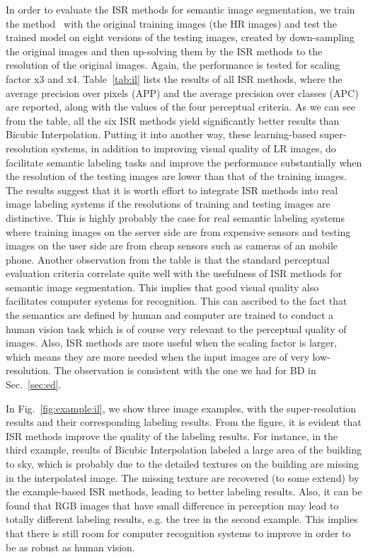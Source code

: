 \documentclass[10pt,twocolumn,letterpaper]{article}
\begin{document}
In order to evaluate the ISR methods for semantic image segmentation, we train the
method~\cite{superpixel:eccv14} with the original training images (\eg the HR images) and
test the trained model on eight versions of the testing images,
created by down-sampling the original images and then up-solving them
by the ISR methods to the resolution of the original images. Again,
the performance is tested for scaling factor x3 and x4.
Table~\ref{tab:il} lists the results of all ISR methods, where the
average precision over pixels (APP) and the average precision over
classes (APC) are reported, along with the values of the four
perceptual criteria. As we can see from the table, all the six ISR
methods yield significantly better results than Bicubic
Interpolation. Putting it into another way, these learning-based
super-resolution systems, in addition to improving visual quality of
LR images, do facilitate semantic labeling tasks and improve the
performance substantially when the resolution of the testing images
are lower than that of the training images. The results suggest that
it is worth effort to integrate ISR methods into real image
labeling systems if the resolutions of training and testing images are
distinctive. This is highly probably the case for real semantic labeling
systems where training images on the server side are from expensive
sensors and testing images on the user side are from cheap sensors
such as cameras of an mobile phone. Another observation from the table
is that the standard perceptual evaluation criteria  correlate
quite well with the usefulness of ISR methods for semantic image segmentation. This
implies that good visual quality also facilitates computer systems for
recognition. This can ascribed to the fact that the semantics are
defined by human and computer are trained to conduct a human vision
task which is of course very relevant to the perceptual quality of
images. Also, ISR methods are more useful when the scaling factor is
larger, which means they are more needed when the input images are
of very low-resolution.  The observation is consistent with the one we had for
BD in Sec.~\ref{sec:ed}.



In Fig.~\ref{fig:example:il}, we show three image examples, with the
super-resolution results and their corresponding labeling
results. From the figure, it is evident that ISR methods improve the
quality of the labeling results. For instance, in the third example,
results of Bicubic Interpolation labeled a large area of the building
to sky, which is probably due to the detailed textures on the building
are missing in the interpolated image. The missing texture  are recovered (to some
extend) by the example-based ISR methods, leading to better labeling
results. Also, it can be found that RGB images that have small
difference in perception may lead to totally different labeling
results, e.g. the tree in the second example. This implies that there
is still room for computer recognition systems to improve
in order to be as robust as human vision.  
\end{document}
